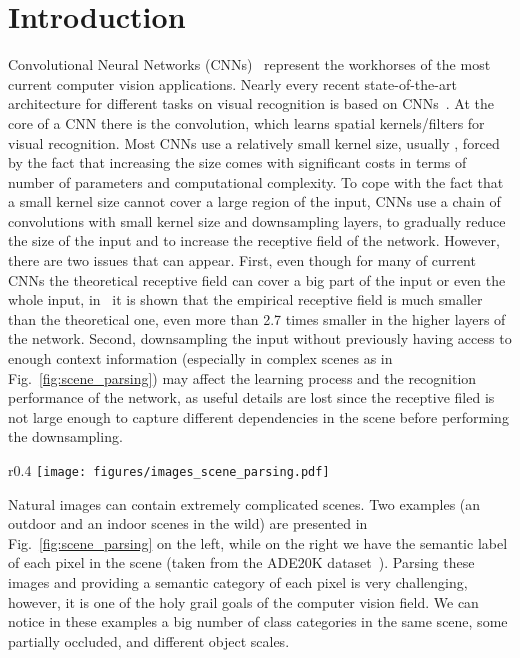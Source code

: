 \documentclass{article}
\begin{document}
\section{Introduction}
Convolutional Neural Networks (CNNs)~\cite{lecun1989backpropagation, lecun1998gradient} represent the workhorses of the most current computer vision applications. Nearly every recent state-of-the-art architecture for different tasks on visual recognition is based on CNNs~\cite{krizhevsky2012imagenet,simonyan2014very,szegedy2015going,ioffe2015batch,he2016deep,he2016identity,chollet2017xception,szegedy2017inception,huang2017densely,zoph2018learning,he2017mask,lin2017focal,lin2017feature,xie2017aggregated,hu2018squeeze,wu2018group}.  At the core of a CNN there is the convolution, which learns spatial kernels/filters for visual recognition. Most CNNs use a relatively small kernel size, usually  , forced by the fact that increasing the size comes with significant costs in terms of number of parameters and computational complexity. To cope with the fact that a small kernel size cannot cover a large region of the input, CNNs use a chain of  convolutions with small kernel size and downsampling layers, to gradually reduce the size of the input and to increase the receptive field of the network. However, there are two issues that can appear. First, even though for  many of current CNNs the theoretical receptive field can cover a big part of the input or even the whole input, in~\cite{zhou2014object} it is shown that the empirical receptive field is much smaller than the theoretical one, even more than 2.7 times smaller in the higher layers of the network. Second, downsampling the input without previously having access to enough context information (especially in complex scenes as in Fig.~\ref{fig:scene_parsing}) may affect the learning process and the recognition performance of the network, as useful details are lost since the receptive filed is not large enough to capture different dependencies in the scene before performing the downsampling.  
\begin{wrapfigure}{r}{0.4\textwidth}
  \centering
  \texttt{[image: figures/images\_scene\_parsing.pdf]}
  \caption{Scene parsing examples. An outdoor and indoor images with their associated pixel-level semantic category.}
  \label{fig:scene_parsing}
  \vspace{-0.2in}
\end{wrapfigure}
Natural images can contain extremely complicated scenes. Two examples (an outdoor and an indoor scenes in the wild) are presented in Fig.~\ref{fig:scene_parsing} on the left, while on the right we have the semantic label of each pixel in the scene (taken from  the ADE20K dataset~\cite{zhou2019semantic}). Parsing these images and providing a semantic category of each pixel is very challenging, however, it is one of the holy grail goals of the computer vision field. We can notice in these examples a big number of class categories in the same scene, some partially occluded, and different object scales.
\end{document}
